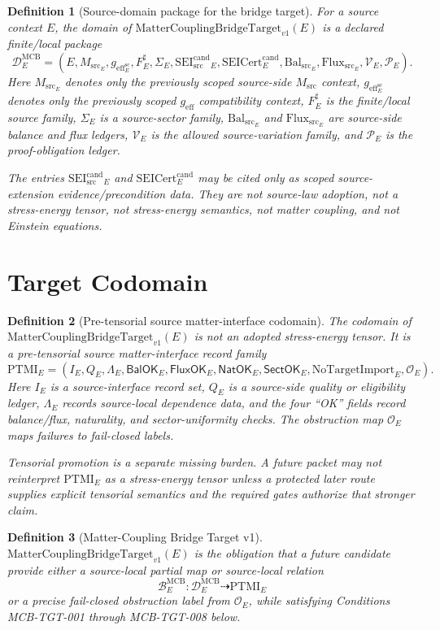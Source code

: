 \documentclass[11pt]{article}
\newcommand{\geff}{g_{\mathrm{eff}}}
\newcommand{\Msrc}{M_{\mathrm{src}}}
\newcommand{\SEICand}{\mathrm{SEI}_{\mathrm{src}}^{\mathrm{cand}}}
\newcommand{\SEICertCand}{\mathrm{SEICert}^{\mathrm{cand}}}
\newcommand{\MCBT}{\mathrm{MatterCouplingBridgeTarget}_{v1}}
\newcommand{\PTMI}{\mathrm{PTMI}}
\newcommand{\NoTargetImport}{\mathrm{NoTargetImport}}
\newcommand{\BalSrc}{\mathrm{Bal}_{\mathrm{src}}}
\newcommand{\FluxSrc}{\mathrm{Flux}_{\mathrm{src}}}
\newtheorem{definition}{Definition}
\begin{document}
\begin{definition}[Source-domain package for the bridge target]
For a source context \(E\), the domain of \(\MCBT(E)\) is a declared
finite/local package
\[
  \mathcal{D}^{\mathrm{MCB}}_E =
  (E,\Msrc_E,\geff_E^{\mathrm{sc}},F_E^\sharp,\Sigma_E,
  \SEICand_E,\SEICertCand_E,\BalSrc_E,\FluxSrc_E,\mathcal{V}_E,
  \mathcal{P}_E).
\]
Here \(\Msrc_E\) denotes only the previously scoped source-side
\(\Msrc\) context, \(\geff_E^{\mathrm{sc}}\) denotes only the previously
scoped \(\geff\) compatibility context, \(F_E^\sharp\) is the finite/local
source family, \(\Sigma_E\) is a source-sector family, \(\BalSrc_E\) and
\(\FluxSrc_E\) are source-side balance and flux ledgers,
\(\mathcal{V}_E\) is the allowed source-variation family, and
\(\mathcal{P}_E\) is the proof-obligation ledger.

The entries \(\SEICand_E\) and \(\SEICertCand_E\) may be cited only as scoped
source-extension evidence/precondition data. They are not source-law
adoption, not a stress-energy tensor, not stress-energy semantics, not matter
coupling, and not Einstein equations.
\end{definition}

\section{Target Codomain}

\begin{definition}[Pre-tensorial source matter-interface codomain]
The codomain of \(\MCBT(E)\) is not an adopted stress-energy tensor. It is a
pre-tensorial source matter-interface record family
\[
  \PTMI_E =
  (I_E,Q_E,\Lambda_E,\mathsf{BalOK}_E,\mathsf{FluxOK}_E,
  \mathsf{NatOK}_E,\mathsf{SectOK}_E,\NoTargetImport_E,\mathcal{O}_E).
\]
Here \(I_E\) is a source-interface record set, \(Q_E\) is a source-side
quality or eligibility ledger, \(\Lambda_E\) records source-local dependence
data, and the four ``OK'' fields record balance/flux, naturality, and
sector-uniformity checks. The obstruction map \(\mathcal{O}_E\) maps failures
to fail-closed labels.

Tensorial promotion is a separate missing burden. A future packet may not
reinterpret \(\PTMI_E\) as a stress-energy tensor unless a protected later
route supplies explicit tensorial semantics and the required gates authorize
that stronger claim.
\end{definition}

\begin{definition}[Matter-Coupling Bridge Target v1]
\(\MCBT(E)\) is the obligation that a future candidate provide either a
source-local partial map or source-local relation
\[
  \mathcal{B}^{\mathrm{MCB}}_E:
  \mathcal{D}^{\mathrm{MCB}}_E \dashrightarrow \PTMI_E
\]
or a precise fail-closed obstruction label from \(\mathcal{O}_E\), while
satisfying Conditions MCB-TGT-001 through MCB-TGT-008 below.
\end{definition}
\end{document}
